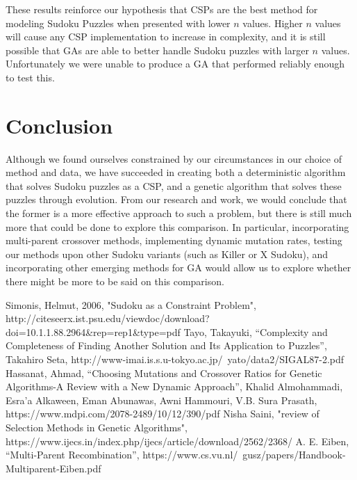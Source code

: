 \documentclass[12pt, conference]{IEEEtran}
\begin{document}
\par
These results reinforce our hypothesis that CSPs are the best method for modeling Sudoku Puzzles when presented with lower $n$ values.
Higher $n$ values will cause any CSP implementation to increase in complexity, and it is still possible that GAs are able to better handle Sudoku puzzles with larger $n$ values.
Unfortunately we were unable to produce a GA that performed reliably enough to test this.

\section{Conclusion}

Although we found ourselves constrained by our circumstances in our choice of method and data, we have succeeded in creating both a deterministic algorithm that solves Sudoku puzzles as a CSP, and a genetic algorithm that solves these puzzles through evolution.
 From our research and work, we would conclude that the former is a more effective approach to such a problem, but there is still much more that could be done to explore this comparison. 
In particular, incorporating multi-parent crossover methods, implementing dynamic mutation rates, testing our methods upon other Sudoku variants (such as Killer or X Sudoku), and incorporating other emerging methods for GA would allow us to explore whether there might be more to be said on this comparison.

\begin{thebibliography}{00}

Simonis, Helmut, 2006, "Sudoku as a Constraint Problem", http://citeseerx.ist.psu.edu/viewdoc/download?doi=10.1.1.88.2964\&rep=rep1\&type=pdf
Tayo, Takayuki, “Complexity and Completeness of Finding Another Solution and Its Application to Puzzles”, Takahiro Seta, http://www-imai.is.s.u-tokyo.ac.jp/~yato/data2/SIGAL87-2.pdf
Hassanat, Ahmad, “Choosing Mutations and Crossover Ratios for Genetic Algorithms-A Review with a New Dynamic Approach”,  Khalid Almohammadi, Esra’a Alkaween, Eman Abunawas, Awni Hammouri, V.B. Sura Prasath, https://www.mdpi.com/2078-2489/10/12/390/pdf 
Nisha Saini, "review of Selection Methods in Genetic Algorithms", https://www.ijecs.in/index.php/ijecs/article/download/2562/2368/
A. E. Eiben, “Multi-Parent Recombination”, https://www.cs.vu.nl/~gusz/papers/Handbook-Multiparent-Eiben.pdf

\end{thebibliography}
\end{document}
